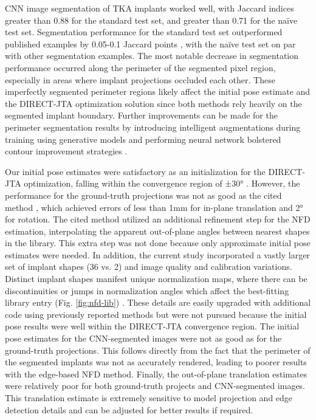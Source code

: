 CNN image segmentation of TKA implants worked well, with Jaccard indices greater than 0.88 for the standard test set, and greater than 0.71 for the naïve test set. Segmentation performance for the standard test set outperformed published examples by 0.05-0.1 Jaccard points \cite{zhouUNetNestedUNet2018,rodriguesDeepSegmentationLeverages2019}, with the naïve test set on par with other segmentation examples. The most notable decrease in segmentation performance occurred along the perimeter of the segmented pixel region, especially in areas where implant projections occluded each other. These imperfectly segmented perimeter regions likely affect the initial pose estimate and the DIRECT-JTA optimization solution since both methods rely heavily on the segmented implant boundary. Further improvements can be made for the perimeter segmentation results by introducing intelligent augmentations during training using generative models \cite{hatayaFasterAutoAugmentLearning2019} and performing neural network bolstered contour improvement strategies \cite{yuanSegFixModelAgnosticBoundary2020}.

Our initial pose estimates were satisfactory as an initialization for the DIRECT-JTA optimization, falling within the convergence region of ±30° \cite{floodAutomatedRegistration3D2018}. However, the performance for the ground-truth projections was not as good as the cited method \cite{banksAccurateMeasurementThreedimensional1996}, which achieved errors of less than 1mm for in-plane translation and 2° for rotation. The cited method utilized an additional refinement step for the NFD estimation, interpolating the apparent out-of-plane angles between nearest shapes in the library. This extra step was not done because only approximate initial pose estimates were needed. In addition, the current study incorporated a vastly larger set of implant shapes (36 vs. 2) and image quality and calibration variations. Distinct implant shapes manifest unique normalization maps, where there can be discontinuities or jumps in normalization angles which affect the best-fitting library entry (Fig. \ref{fig:nfd-lib}) \cite{wallaceAnalysisThreedimensionalMovement1980,wallaceEfficientThreedimensionalAircraft1980}. These details are easily upgraded with additional code using previously reported methods but were not pursued because the initial pose results were well within the DIRECT-JTA convergence region. The initial pose estimates for the CNN-segmented images were not as good as for the ground-truth projections. This follows directly from the fact that the perimeter of the segmented implants was not as accurately rendered, leading to poorer results with the edge-based NFD method. Finally, the out-of-plane translation estimates were relatively poor for both ground-truth projects and CNN-segmented images. This translation estimate is extremely sensitive to model projection and edge detection details and can be adjusted for better results if required.

